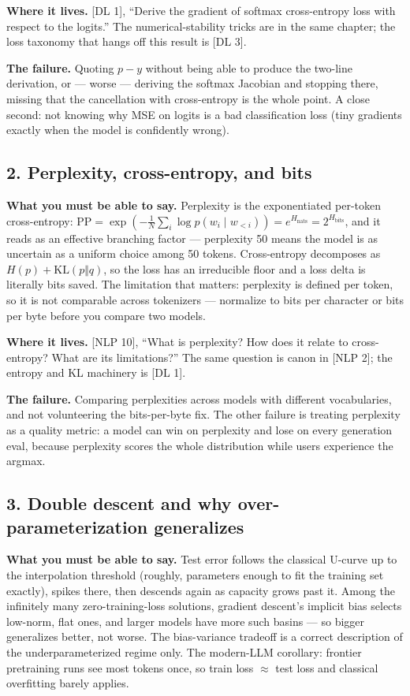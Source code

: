 \textbf{Where it lives.} [DL 1], ``Derive the gradient of softmax cross-entropy loss with respect to the logits.'' The numerical-stability tricks are in the same chapter; the loss taxonomy that hangs off this result is [DL 3].

\textbf{The failure.} Quoting $p - y$ without being able to produce the two-line derivation, or --- worse --- deriving the softmax Jacobian and stopping there, missing that the cancellation with cross-entropy is the whole point. A close second: not knowing why MSE on logits is a bad classification loss (tiny gradients exactly when the model is confidently wrong).

\subsection*{2. Perplexity, cross-entropy, and bits}

\textbf{What you must be able to say.} Perplexity is the exponentiated per-token cross-entropy: $\mathrm{PP} = \exp(-\frac{1}{N}\sum_i \log p(w_i \mid w_{<i})) = e^{H_{\text{nats}}} = 2^{H_{\text{bits}}}$, and it reads as an effective branching factor --- perplexity 50 means the model is as uncertain as a uniform choice among 50 tokens. Cross-entropy decomposes as $H(p) + \mathrm{KL}(p \Vert q)$, so the loss has an irreducible floor and a loss delta is literally bits saved. The limitation that matters: perplexity is defined per token, so it is not comparable across tokenizers --- normalize to bits per character or bits per byte before you compare two models.

\textbf{Where it lives.} [NLP 10], ``What is perplexity? How does it relate to cross-entropy? What are its limitations?'' The same question is canon in [NLP 2]; the entropy and KL machinery is [DL 1].

\textbf{The failure.} Comparing perplexities across models with different vocabularies, and not volunteering the bits-per-byte fix. The other failure is treating perplexity as a quality metric: a model can win on perplexity and lose on every generation eval, because perplexity scores the whole distribution while users experience the argmax.

\subsection*{3. Double descent and why over-parameterization generalizes}

\textbf{What you must be able to say.} Test error follows the classical U-curve up to the interpolation threshold (roughly, parameters enough to fit the training set exactly), spikes there, then descends again as capacity grows past it. Among the infinitely many zero-training-loss solutions, gradient descent's implicit bias selects low-norm, flat ones, and larger models have more such basins --- so bigger generalizes better, not worse. The bias-variance tradeoff is a correct description of the underparameterized regime only. The modern-LLM corollary: frontier pretraining runs see most tokens once, so train loss $\approx$ test loss and classical overfitting barely applies.

